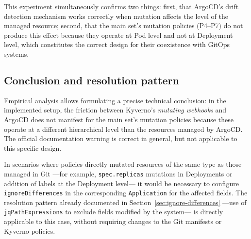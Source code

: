 This experiment simultaneously confirms two things: first, that ArgoCD's drift detection mechanism works correctly when mutation affects the level of the managed resource; second, that the main set's mutation policies (P4--P7) do not produce this effect because they operate at Pod level and not at Deployment level, which constitutes the correct design for their coexistence with GitOps systems.

\subsection{Conclusion and resolution pattern}

Empirical analysis allows formulating a precise technical conclusion: in the implemented setup, the friction between Kyverno's \textit{mutating webhooks} and ArgoCD does not manifest for the main set's mutation policies because these operate at a different hierarchical level than the resources managed by ArgoCD. The official documentation warning is correct in general, but not applicable to this specific design.

In scenarios where policies directly mutated resources of the same type as those managed in Git ---for example, \texttt{spec.replicas} mutations in Deployments or addition of labels at the Deployment level--- it would be necessary to configure \texttt{ignoreDifferences} in the corresponding \texttt{Application} for the affected fields. The resolution pattern already documented in Section~\ref{sec:ignore-differences} ---use of \texttt{jqPathExpressions} to exclude fields modified by the system--- is directly applicable to this case, without requiring changes to the Git manifests or Kyverno policies.
